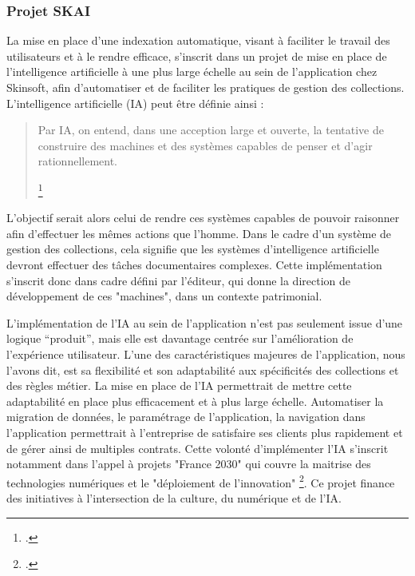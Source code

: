 \subsubsection{Projet SKAI} 

La mise en place d'une indexation automatique, visant à faciliter le travail des utilisateurs et à le rendre efficace, s'inscrit dans un projet de mise en place de l'intelligence artificielle à une plus large échelle au sein de l'application chez Skinsoft, afin d'automatiser et de faciliter les pratiques de gestion des collections. L'intelligence artificielle (IA) peut être définie ainsi : 

\begin{quote} 
	
	Par IA, on entend, dans une acception large et ouverte, la tentative de construire des machines et des systèmes capables de penser et d'agir rationnellement. 
	
	\footcite{zotero-item-584} 
	
\end{quote} 



L'objectif serait alors celui de rendre ces systèmes capables de pouvoir raisonner afin d'effectuer les mêmes actions que l'homme. Dans le cadre d'un système de gestion des collections, cela signifie que les systèmes d'intelligence artificielle devront effectuer des tâches documentaires complexes. Cette implémentation s'inscrit donc dans cadre défini par l’éditeur, qui donne la direction de développement de ces "machines", dans un contexte patrimonial. 



L'implémentation de l'IA au sein de l'application n'est pas seulement issue d'une logique “produit”, mais elle est davantage centrée sur l'amélioration de l'expérience utilisateur. L'une des caractéristiques majeures de l'application, nous l'avons dit, est sa flexibilité et son adaptabilité aux spécificités des collections et des règles métier. La mise en place de l'IA permettrait de mettre cette adaptabilité en place plus efficacement et à plus large échelle. Automatiser la migration de données, le paramétrage de l'application, la navigation dans l'application permettrait à l'entreprise de satisfaire ses clients plus rapidement et de gérer ainsi de multiples contrats. Cette volonté d'implémenter l'IA s'inscrit notamment dans l'appel à projets "France 2030" qui couvre la maitrise des technologies numériques et le "déploiement de l'innovation" \footcite{zotero-item-636}. Ce projet finance des initiatives à l'intersection de la culture, du numérique et de l'IA. 

